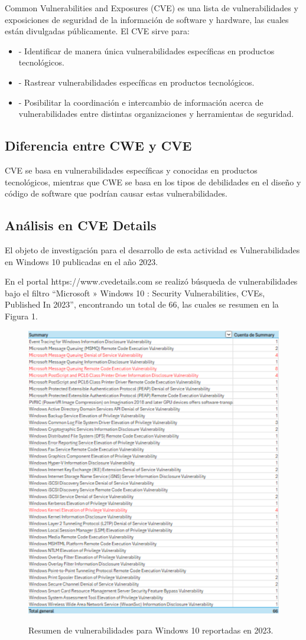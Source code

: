 \documentclass[stu, 11pt, letterpaper, donotrepeattitle, floatsintext, natbib]{apa7}
\begin{document}
Common Vulnerabilities and Exposures (CVE) es una lista de vulnerabilidades y exposiciones de seguridad de la información de software y hardware, las cuales están divulgadas públicamente. El CVE sirve para:

\begin{itemize}
\item[] - Identificar de manera única vulnerabilidades específicas en productos tecnológicos.
\item[] - Rastrear vulnerabilidades específicas en productos tecnológicos.
\item[] - Posibilitar la coordinación e intercambio de información acerca de vulnerabilidades entre distintas organizaciones y herramientas de seguridad.
\end{itemize}

\subsection{Diferencia entre CWE y CVE} 

CVE se basa en vulnerabilidades específicas y conocidas en productos tecnológicos, mientras que CWE se basa en los tipos de debilidades en el diseño y código de software que podrían causar estas vulnerabilidades.

\subsection{Análisis en CVE Details} 

El objeto de investigación para el desarrollo de esta actividad es Vulnerabilidades en Windows 10 publicadas en el año 2023.

En el portal https://www.cvedetails.com se realizó búsqueda de vulnerabilidades bajo el filtro “Microsoft » Windows 10 : Security Vulnerabilities, CVEs, Published In 2023”, encontrando un total de 66, las cuales se resumen en la Figura 1.

\begin{figure}[H]
    \centering
    \caption{Resumen de vulnerabilidades para Windows 10 reportadas en 2023.}
    \includegraphics[width=0.3\linewidth]{ac11.png} %
    \label{fig:OverallEffect}
\end{figure}
\end{document}
